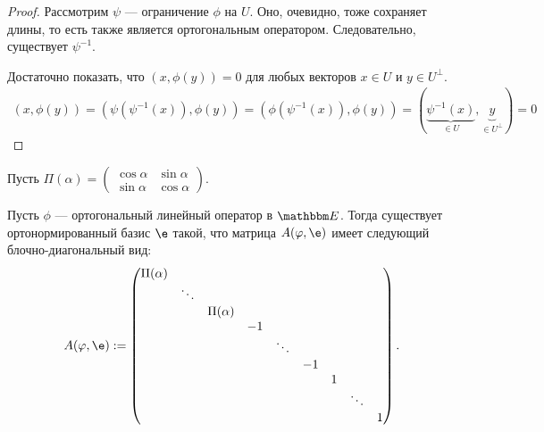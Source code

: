 \begin{proof}
Рассмотрим $\psi$ --- ограничение $\phi$ на $U$. Оно, очевидно, тоже сохраняет длины, то есть также является ортогональным оператором. Следовательно, существует $\psi^{-1}$.

Достаточно показать, что $(x, \phi(y)) = 0$ для любых векторов $x \in U$ и $y \in U^\perp$.
\begin{gather*}
(x, \phi(y)) = (\psi(\psi^{-1}(x)), \phi(y)) = (\phi(\psi^{-1}(x)), \phi(y)) = (\underbrace{\psi^{-1}(x)}_{\in U}, \underbrace{y}_{\in U^\perp}) = 0
\end{gather*}
\end{proof}

Пусть $\Pi(\alpha) = \begin{pmatrix}
\cos\alpha & \sin\alpha \\
\sin\alpha & \cos\alpha
\end{pmatrix}$.

\begin{Theorem}
Пусть $\phi$ --- ортогональный линейный оператор в $\E$. Тогда существует ортонормированный базис $\e$ такой, что матрица $A(\phi, \e)$ имеет следующий блочно-диагональный вид:
$$
A(\phi, \e) :=
\begin{pmatrix}
\Pi(\alpha)\\
&\ddots \\
&&\Pi(\alpha)\\
&&&-1\\
&&&&\ddots\\
&&&&&-1\\
&&&&&& 1\\
&&&&&&& \ddots \\
&&&&&&&& 1
\end{pmatrix}.
$$
\end{Theorem}




